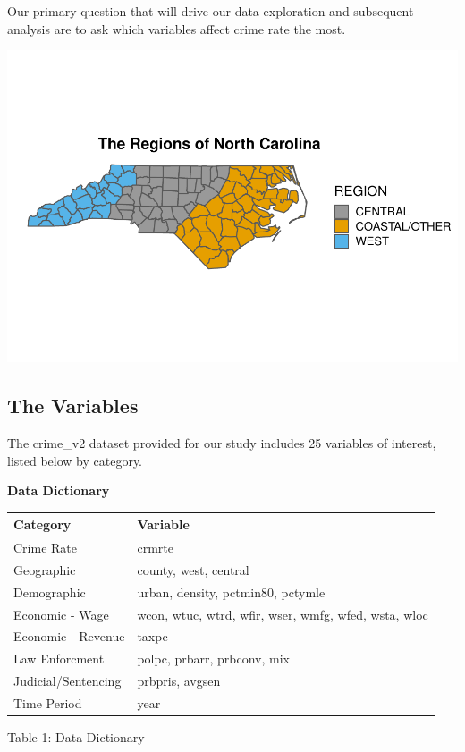 \documentclass[]{article}
\begin{document}
Our primary question that will drive our data exploration and subsequent
analysis are to ask which variables affect crime rate the most.

\includegraphics{Bagnard_Gaustad_Hartman_Leung_Lab_3_files/figure-latex/unnamed-chunk-1-1.pdf}

\hypertarget{the-variables}{%
\subsection{The Variables}\label{the-variables}}

The crime\_v2 dataset provided for our study includes 25 variables of
interest, listed below by category.

\begin{center}
\textbf{Data Dictionary}
\end{center}

\begin{longtable}[]{@{}ll@{}}
\toprule
Category & Variable\tabularnewline
\midrule
\endhead
Crime Rate & crmrte\tabularnewline
Geographic & county, west, central\tabularnewline
Demographic & urban, density, pctmin80, pctymle\tabularnewline
Economic - Wage & wcon, wtuc, wtrd, wfir, wser, wmfg, wfed, wsta,
wloc\tabularnewline
Economic - Revenue & taxpc\tabularnewline
Law Enforcment & polpc, prbarr, prbconv, mix\tabularnewline
Judicial/Sentencing & prbpris, avgsen\tabularnewline
Time Period & year\tabularnewline
\bottomrule
\end{longtable}

\begin{center}
Table 1: Data Dictionary
\end{center}
\end{document}

